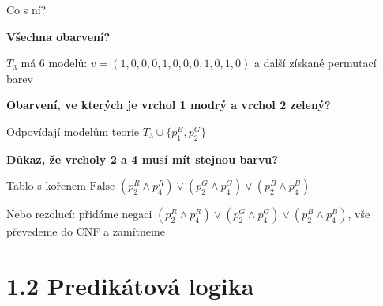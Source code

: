 \documentclass{beamer}
\begin{document}
\begin{frame}{Co s ní?}

\textbf{Všechna obarvení?} 

$T_3$ má 6 modelů: \( v = (1,0,0,0,1,0,0,0,1,0,1,0) \) a další získané permutací barev \vspace{-12pt}
\begin{center}
\end{center}

\pause

\textbf{Obarvení, ve kterých je vrchol 1 modrý a vrchol 2 zelený?} 

Odpovídají modelům teorie \( T_3 \cup \{ p_1^B, p_2^G\} \)

\pause

\textbf{Důkaz, že vrcholy 2 a 4 musí mít stejnou barvu?}

\alert{Tablo} s kořenem $\text{False  }(p_2^R \land p_4^R)\lor(p_2^G \land p_4^G)\lor(p_2^B \land p_4^B)$

\pause

Nebo \alert{rezolucí}: přidáme \alert{negaci} \( (p_2^R \land p_4^R)\lor(p_2^G \land p_4^G)\lor(p_2^B \land p_4^B) \), vše převedeme do CNF a zamítneme

\end{frame}


\section{1.2 Predikátová logika}
\end{document}
